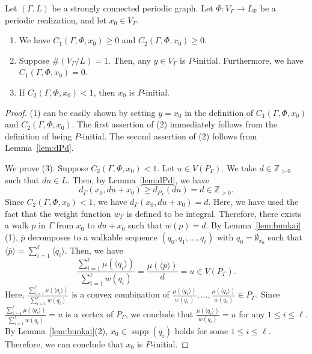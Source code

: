 \documentclass[ALCO,published]{cedram}
\theoremstyle{remark}
\begin{document}
\begin{lem}\label{lem:C1C2}
Let $(\Gamma , L)$ be a strongly connected periodic graph. 
Let $\Phi : V_{\Gamma} \to L_{\mathbb{R}}$ be a periodic realization, and let $x_0 \in V_{\Gamma}$. 
\begin{enumerate}
\item We have $C_{1}(\Gamma, \Phi, x_0) \ge 0$ and $C_{2}(\Gamma, \Phi, x_0) \ge 0$. 
\item Suppose $\# (V_{\Gamma} /L) = 1$. 
Then, any $y \in V_{\Gamma}$ is $P$-initial. Furthermore, we have $C_{1}(\Gamma, \Phi, x_0) = 0$. 
\item If $C_{2}(\Gamma, \Phi, x_0) < 1$, then $x_0$ is $P$-initial. 
\end{enumerate}
\end{lem}
\begin{proof}
(1) can be easily shown by setting $y = x_0$ in the definition of $C_{1}(\Gamma, \Phi, x_0)$ and $C_{2}(\Gamma, \Phi, x_0)$. 
The first assertion of (2) immediately follows from the definition of being $P$-initial. 
The second assertion of (2) follows from Lemma~\ref{lem:dPd}. 

We prove (3). 
Suppose $C_{2}(\Gamma, \Phi, x_0) < 1$. 
Let $u \in V(P_{\Gamma})$. 
We take $d \in \mathbb{Z}_{>0}$ such that $du \in L$. 
Then, by Lemma~\ref{lem:dPd}, we have 
\[
d_{\Gamma}(x_0, du + x_0) \ge d_{P_{\Gamma}}(du) = d \in \mathbb{Z}_{>0}. 
\]
Since $C_{2}(\Gamma, \Phi, x_0) < 1$, we have $d_{\Gamma}(x_0, du + x_0) = d$. 
Here, we have used the fact that the weight function $w _{\Gamma}$ is defined to be integral. 
Therefore, there exists a walk $p$ in $\Gamma$ from $x_0$ to $du + x_0$ such that $w(p) = d$. 
By Lemma~\ref{lem:bunkai}(1), $\overline{p}$ decomposes to a walkable sequence $(q_0, q_1, \ldots , q_{\ell})$ with $q_0 = \emptyset _{\overline{x_0}}$ such that 
$\langle \overline{p} \rangle = \sum _{i = 1} ^{\ell} \langle q_i \rangle$. 
Then, we have 
\[
\frac{\sum _{i=1}^{\ell} \mu(\langle q_i \rangle)}{\sum _{i=1}^{\ell} w(q_i)} 
= \frac{\mu (\langle \overline{p} \rangle)}{d} = u \in V(P_{\Gamma}). 
\]
Here, $\frac{\sum _{i=1}^{\ell} \mu(\langle q_i \rangle)}{\sum _{i=1}^{\ell} w(q_i)}$ is a convex combination of 
$\frac{\mu(\langle q_1 \rangle)}{w(q_1)}, \ldots, \frac{\mu(\langle q_{\ell} \rangle)}{w(q_{\ell})} \in P_{\Gamma}$. 
Since $\frac{\sum _{i=1}^{\ell} \mu(\langle q_i \rangle)}{\sum _{i=1}^{\ell} w(q_i)} = u$ is a vertex of $P_{\Gamma}$, 
we conclude that $\frac{\mu (\langle q_i \rangle)}{w(q_i)} = u$ for any $1 \le i \le \ell$. 
By Lemma~\ref{lem:bunkai}(2), $\overline{x_0} \in \operatorname{supp}(q_i)$ holds for some $1 \le i \le \ell$. 
Therefore, we can conclude that $x_0$ is $P$-initial. 
\end{proof}
\end{document}
